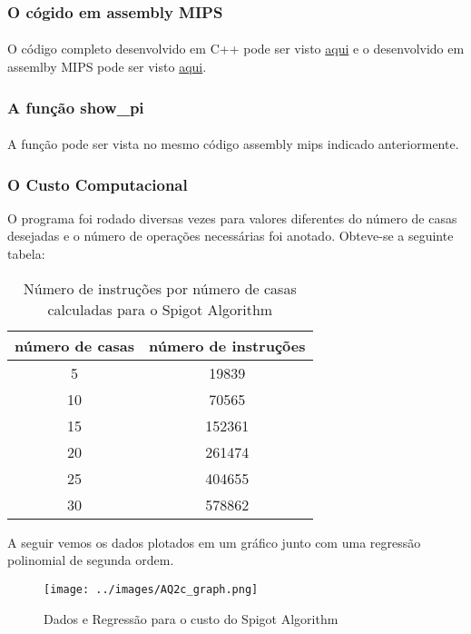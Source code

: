 \subsubsection{O cógido em assembly MIPS}
\paragraph{}O código completo desenvolvido em C++ pode ser visto
\href{https://github.com/JuarezASF/LaTeX/blob/master/UnB2014/OAC/exp2/code/PI_digits_cpp.cpp}{aqui} e o desenvolvido
em assemlby MIPS pode ser visto \href{https://github.com/JuarezASF/LaTeX/blob/master/UnB2014/OAC/exp2/code/piDigits_assembly_mips.asm}{aqui}.

\subsubsection{A função show\_pi}
\paragraph{} A função pode ser vista no mesmo código assembly mips indicado anteriormente.

\subsubsection{O Custo Computacional}
O programa foi rodado diversas vezes para valores diferentes do número de casas desejadas e o número de operações
necessárias foi anotado. Obteve-se a seguinte tabela:
\begin{table}[H]
	\centering 
	\begin{tabular}{|c|c|}\hline
	número de casas & número de instruções \\ \hline
	5	& 19839 \\ \hline
10	& 	70565 \\ \hline
15	& 	152361 \\ \hline
20		& 261474 \\ \hline
25		& 404655 \\ \hline
30	& 	578862 \\ \hline
	\end{tabular}
	\caption{Número de instruções por número de casas calculadas para o Spigot Algorithm}
\end{table}

A seguir vemos os dados plotados em um gráfico junto com uma regressão polinomial de segunda ordem.

         \begin{figure}[H]
                 \centering
                 \texttt{[image: ../images/AQ2c\_graph.png]}
                \caption{Dados e Regressão para o custo do Spigot Algorithm}
         \end{figure}
         
